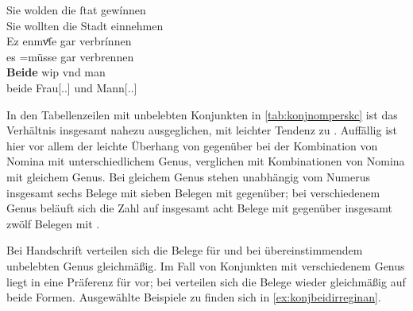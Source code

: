 \begin{exe}
\begin{xlist}
	\ex \label{ex:konjmixbeide2_4}
		\gll Sie wolden die ſtat gewínnen \\
			Sie wollten die Stadt einnehmen \\
	\sn \gll Ez enmvͤſe gar verbrínnen \\
			es \Neg=müsse gar verbrennen \\
	\sn \gll \textbf{Beide} wip vnd man \\
			beide Frau[\Nom.\Pl.\NeutF] und Mann[\Nom.\Pl.\MascM] \\
		\begin{taggedline}{\parencites[\pno~21\vb, 7--8]{kc:VB}[vgl.~abweichend][4379--4381]{schroeder1895}}
		\trans {}
		\end{taggedline}
	\end{xlist}
\end{exe}

In den Tabellenzeilen mit unbelebten Konjunkten in \cref{tab:konjnomperskc} ist
das Verhältnis insgesamt nahezu ausgeglichen, mit leichter Tendenz zu
. Auffällig ist hier vor allem der leichte Überhang von
 gegenüber  bei der Kombination von Nomina mit
unterschiedlichem Genus,
verglichen mit Kombinationen von Nomina
mit gleichem Genus. Bei gleichem Genus stehen unabhängig vom Numerus insgesamt
sechs Belege mit  sieben Belegen mit  gegenüber; bei
verschiedenem Genus beläuft sich die Zahl auf insgesamt acht Belege mit
 gegenüber insgesamt zwölf Belegen mit .


Bei Handschrift \citet{kc:VB} verteilen sich die Belege für  und
 bei übereinstimmendem unbelebten Genus gleichmäßig. Im Fall von
Konjunkten mit verschiedenem Genus liegt in \citet{kc:VB} eine Präferenz für
 vor; bei \citet{kc:A1} verteilen sich die Belege wieder
gleichmäßig auf beide Formen. Ausgewählte Beispiele zu 
finden sich in \cref{ex:konjbeidirreginan}.

